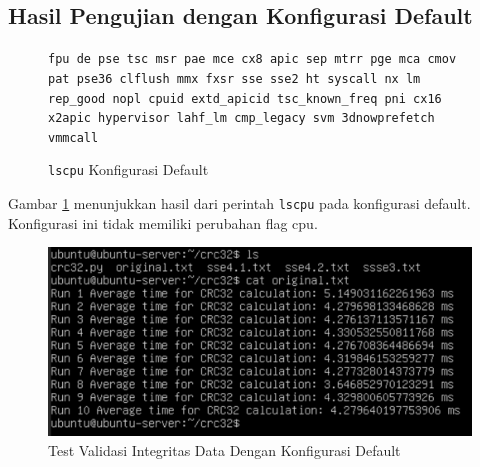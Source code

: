 \subsection{Hasil Pengujian dengan Konfigurasi Default}
\begin{figure}
    \texttt{fpu de pse tsc msr pae mce cx8 apic sep mtrr pge mca cmov pat pse36 clflush mmx fxsr sse sse2 ht syscall nx lm rep\_good nopl cpuid extd\_apicid tsc\_known\_freq pni cx16 x2apic hypervisor lahf\_lm cmp\_legacy svm 3dnowprefetch vmmcall}
    \caption{\texttt{lscpu} Konfigurasi Default}
    \label{fig:lscpu_file_integrity_test_default}
\end{figure}

Gambar \ref{fig:lscpu_file_integrity_test_default} menunjukkan hasil dari perintah \texttt{lscpu} pada konfigurasi default. Konfigurasi ini tidak memiliki perubahan flag cpu.

\begin{figure}
    \centering
    \includegraphics[width=1\textwidth]
    {assets/pics/crc-test/original.jpeg}
    \caption{Test Validasi Integritas Data Dengan Konfigurasi Default}
    \label{fig:file_integrity_test_default}
\end{figure}


